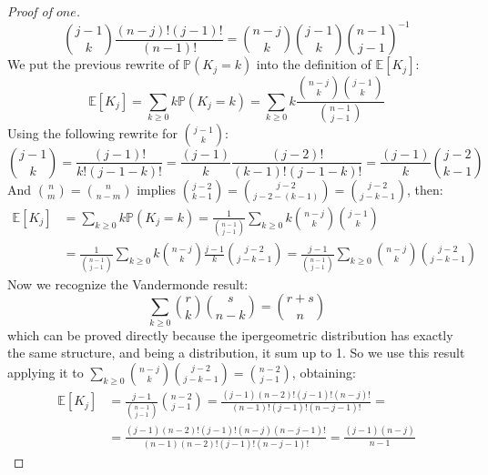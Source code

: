 \begin{proof}[Proof of $one$]
\begin{displaymath}
    {{j-1}\choose{k}} \frac{(n-j)! (j-1)! }{(n-1)!} =  {{n-j}\choose{k}}
    {{j-1}\choose{k}} {{n-1}\choose{j-1}}^{-1}
  \end{displaymath}
  We put the previous rewrite of $\mathbb{P}\left(K_j = k \right)$ into
  the definition of $\mathbb{E} \left[ K_j \right]$:
  \begin{displaymath}
    \mathbb{E} \left[ K_j \right] = \sum_{k \geq 0}{k \mathbb{P}\left(
        K_j = k      \right) }  = \sum_{k \geq 0}{k \frac{{{n-j}\choose{k}}
        {{j-1}\choose{k}}}{{{n-1}\choose{j-1}}}}
  \end{displaymath}
  Using the following rewrite for ${{j-1}\choose{k}}$:
  \begin{displaymath}
    {{j-1}\choose{k}} =  \frac{(j-1)!}{k!(j-1-k)!} =
    \frac{(j-1)}{k} \frac{(j-2)!}{(k-1)!(j-1-k)!} =
    \frac{(j-1)}{k}{{j-2}\choose{k-1}}
  \end{displaymath}
  And ${{n}\choose{m}} = {{n}\choose{n-m}}$ implies ${{j-2}\choose{k-1}}
  = {{j-2}\choose{j-2 -(k-1)}} = {{j-2}\choose{j -k-1}}$, then:
  \begin{displaymath}
    \begin{split}
      \mathbb{E} \left[ K_j \right] &= \sum_{k \geq 0}{k
        \mathbb{P}\left( K_j = k \right) } =
      \frac{1}{{{n-1}\choose{j-1}}} \sum_{k \geq 0}{k
        {{n-j}\choose{k}} {{j-1}\choose{k}}} \\
      &= \frac{1}{{{n-1}\choose{j-1}}} \sum_{k \geq 0}{k
        {{n-j}\choose{k}}  \frac{j-1}{k}{{j-2}\choose{j-k-1}}}
      = \frac{j-1}{{{n-1}\choose{j-1}}} \sum_{k \geq 0}{
        {{n-j}\choose{k}} {{j-2}\choose{j-k-1}}}
    \end{split}
  \end{displaymath}
  Now we recognize the Vandermonde result:
  \begin{displaymath}
    \sum_{k \geq 0}{{{r}\choose{k}} {{s}\choose{n-k}}  } =
    {{r + s}\choose{n}}
  \end{displaymath}
  which can be proved directly because the ipergeometric distribution
  has exactly the same structure, and being a distribution, it sum up
  to 1. So we use this result applying it to $\sum_{k \geq 0}{
    {{n-j}\choose{k}} {{j-2}\choose{j-k-1}}} = {{n-2}\choose{j-1}} $,
  obtaining:
  \begin{displaymath}
    \begin{split}
      \mathbb{E} \left[ K_j \right] &= \frac{j-1}{{{n-1}\choose{j-1}}}
      {{n-2}\choose{j-1}} =
      \frac{(j-1)(n-2)!(j-1)!(n-j)!}{(n-1)!(j-1)!(n-j-1)!}=\\
      &=\frac{(j-1)(n-2)!(j-1)!(n-j)(n-j-1)!}
      {(n-1)(n-2)!(j-1)!(n-j-1)!}= \frac{(j-1)(n-j)}{n-1}
    \end{split}
  \end{displaymath}
\end{proof}
